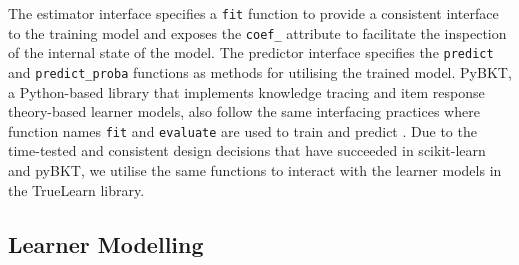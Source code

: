 \documentclass[letterpaper]{article} %
\begin{document}
The estimator interface specifies a \verb|fit| function to provide a consistent interface to the training model and exposes the \verb|coef_| attribute to facilitate the inspection of the internal state of the model. The predictor interface specifies the \verb|predict| and \verb|predict_proba| functions as methods for utilising the trained model. PyBKT, a Python-based library that implements knowledge tracing and item response theory-based learner models, also follow the same interfacing practices where function names \verb|fit| and \verb|evaluate| are used to train and predict \cite{psych5030050}.
Due to the time-tested and consistent design decisions that have succeeded in scikit-learn and pyBKT, we utilise the same functions to interact with the learner models in the TrueLearn library.


\subsection{Learner Modelling}
\end{document}
